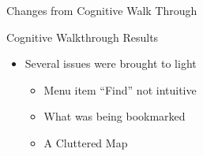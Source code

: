 \documentclass{beamer}
\begin{document}
\begin{frame}{Changes from Cognitive Walk Through}
    \begin{block}{Cognitive Walkthrough Results} 
    \begin{itemize}
        \item Several issues were brought to light
        \begin{itemize}
            \item Menu item ``Find'' not intuitive
            \item What was being bookmarked
            \item A Cluttered Map
        \end{itemize}
    \end{itemize}
    \end{block}
\end{frame}
\end{document}
